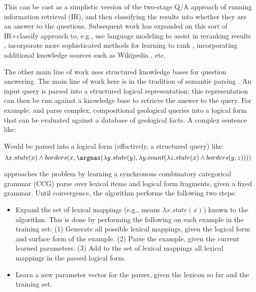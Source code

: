 This can be cast as a simplistic version of the two-stage Q/A approach of running information
  retrieval (IR), and then classifying the results into whether they are an answer to the
  questions.
Subsequent work has expanded on this sort of IR+classify approach to, e.g., use language
  modeling to assist in reranking results \cite{key:2006chen-trec}, incorporate
  more sophisticated methods for learning to rank \cite{key:2007cao-trec},
  incorporating additional knowledge sources such as Wikipedia \cite{key:2004ahn-trec},
  etc.

The other main line of work uses structured knowledge bases for question answering.
The main line of work here is in the tradition of semantic parsing
  \cite{key:2005kate-semantics,key:2005zettlemoyer-semantics,key:2011liang-semantics}.
An input query is parsed into a structured logical representation; this representation
  can then be run against a knowledge base to retrieve the answer to the query.
For example,  and  
  parse complex, compositional geological
  queries into a logical form that can be evaluated against a database of geological facts.
A complex sentence like:

\begin{displayquote}
\end{displayquote}

Would be parsed into a logical form (effectively, a structured query) like:
\begin{equation*}
\lambda x . state(x) \land borders(x, \argmax( \lambda y . state(y), \lambda y . count (\lambda z . state(x) \land borders(y, z))))
\end{equation*}

 approaches the problem by learning a synchronous
  combinatory categorical grammar (CCG) \cite{key:2004bos-ccg} 
  parse over lexical items and logical form fragments,
  given a fixed grammar.
Until convergence, the algorithm performs the following two steps:
\begin{itemize}
  \item Expand the set of lexical mappings (e.g.,  means $\lambda x . state(x)$) 
        known to the algorithm. 
        This is done by performing the following on each example in the training set:
        (1) Generate all possible lexical mappings, given the logical form and surface
            form of the example.
        (2) Parse the example, given the current learned parameters.
        (3) Add to the set of lexical mappings all lexical mappings in the parsed
            logical form.
  \item Learn a new parameter vector for the parser, given the lexicon so far and the
        training set.
\end{itemize}

